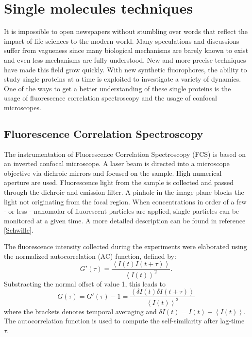 \documentclass[twoside,single]{lion-msc}
\begin{document}
\section{Single molecules techniques}
It is impossible to open newspapers without stumbling over words that reflect the impact of life sciences to the modern world. Many speculations and discussions suffer from vagueness since many biological mechanisms are barely known to exist and even less mechanisms are fully understood. New and more precise techniques have made this field grow quickly. With new synthetic fluorophores, the ability to study single proteins at a time is exploited to investigate a variety of dynamics.  One of the ways to get a better understanding of these single proteins is the usage of fluorescence correlation spectroscopy and the usage of confocal microscopes. 

\subsection{Fluorescence Correlation Spectroscopy}
The instrumentation of Fluorescence Correlation Spectroscopy (FCS) is based on an inverted confocal microscope.  A laser beam is directed into a microscope objective via dichroic mirrors and focused on the sample. High numerical aperture are used. Fluorescence light from the sample is collected and passed through the dichroic and emission filter. A pinhole in the image plane blocks the light not originating from the focal region. When concentrations in order of a few - or less - nanomolar of fluorescent particles are applied, single particles can be monitored at a given time. A more detailed description can be found in reference \ref{Schwille}.

The fluorescence intensity collected during the experiments were elaborated using the normalized autocorrelation (AC) function, defined by:
\begin{equation}
G'(\tau) = \frac{\left \langle I(t)I(t + \tau) \right \rangle}{\left \langle I(t)\right \rangle ^{2}}.
\end{equation}
Substracting the normal offset of value 1, this leads to
\begin{equation} \label{AC}
G(\tau) = G'(\tau) - 1 =  \frac{\left \langle \delta I(t)\delta I(t + \tau) \right \rangle}{\left \langle I(t)\right \rangle ^{2}}
\end{equation}
where the brackets  denotes temporal averaging and $\delta I(t) = I(t) - \left \langle I(t)\right \rangle$. The autocorrelation function is used to compute the self-similarity after lag-time $\tau$.
\end{document}
